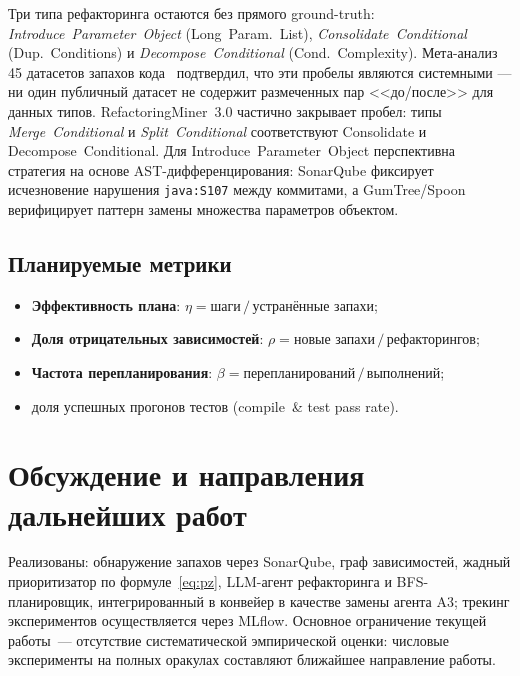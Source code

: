 \documentclass[conference]{IEEEtran}
\begin{document}
Три типа рефакторинга остаются без прямого ground-truth:
\textit{Introduce~Parameter~Object} (Long~Param.~List),
\textit{Consolidate~Conditional} (Dup.~Conditions) и
\textit{Decompose~Conditional} (Cond.~Complexity).
Мета-анализ 45 датасетов запахов кода~\cite{cedrim2017,lenarduzzi2019}
подтвердил, что эти пробелы являются системными --- ни один публичный
датасет не содержит размеченных пар <<до/после>> для данных типов.
RefactoringMiner~3.0 частично закрывает пробел: типы
\textit{Merge~Conditional} и \textit{Split~Conditional}
соответствуют Consolidate и Decompose~Conditional.
Для Introduce~Parameter~Object перспективна стратегия на основе
AST-дифференцирования: SonarQube фиксирует исчезновение
нарушения \texttt{java:S107} между коммитами, а GumTree/Spoon
верифицирует паттерн замены множества параметров объектом.

\subsection{Планируемые метрики}

\begin{itemize}
  \item \textbf{Эффективность плана}:
        $\eta = {\text{шаги}}\,/\,{\text{устранённые запахи}}$;
  \item \textbf{Доля отрицательных зависимостей}:
        $\rho = {\text{новые запахи}}\,/\,{\text{рефакторингов}}$;
  \item \textbf{Частота перепланирования}:
        $\beta = {\text{перепланирований}}\,/\,{\text{выполнений}}$;
  \item доля успешных прогонов тестов (compile~\& test pass rate).
\end{itemize}

\section{Обсуждение и направления дальнейших работ}

Реализованы: обнаружение запахов через SonarQube, граф зависимостей,
жадный приоритизатор по формуле~\eqref{eq:pz}, LLM-агент рефакторинга
и BFS-планировщик, интегрированный в конвейер в качестве замены
агента A3; трекинг экспериментов осуществляется через MLflow.
Основное ограничение текущей работы~--- отсутствие систематической
эмпирической оценки: числовые эксперименты на полных оракулах
составляют ближайшее направление работы.
\end{document}
